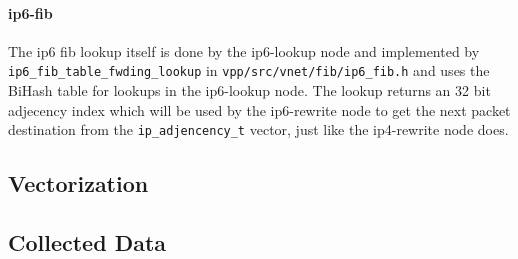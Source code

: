
\paragraph{ip6-fib}

The ip6 \Ac{fib} lookup itself is done by the ip6-lookup node and
implemented by \lstinline|ip6_fib_table_fwding_lookup| in
\lstinline|vpp/src/vnet/fib/ip6_fib.h| and uses the BiHash table for
lookups in the ip6-lookup node. The lookup returns an 32 bit adjecency
index which will be used by the ip6-rewrite node to get the next
packet destination from the \lstinline|ip_adjencency_t| vector, just
like the ip4-rewrite node does.



\subsection{Vectorization}



\subsection{Collected Data}





